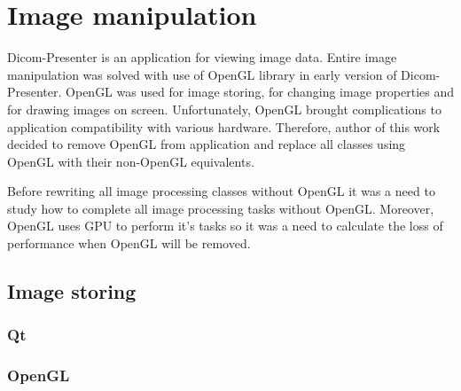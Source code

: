 \chapter{Image manipulation}
\vspace{-10mm}

Dicom-Presenter is an application for viewing image data. Entire image manipulation was solved with use of OpenGL library in early version of Dicom-Presenter. OpenGL was used for image storing, for changing image properties and for drawing images on screen. Unfortunately, OpenGL brought complications to application compatibility with various hardware. Therefore, author of this work decided to remove OpenGL from application and replace all classes using OpenGL with their non-OpenGL equivalents. 

Before rewriting all image processing classes without OpenGL it was a need to study how to complete all image processing tasks without OpenGL. Moreover, OpenGL uses GPU to perform it's tasks so it was a need to calculate the loss of performance when OpenGL will be removed. 

\section{Image storing}



\subsection{Qt}


\subsection{OpenGL}

